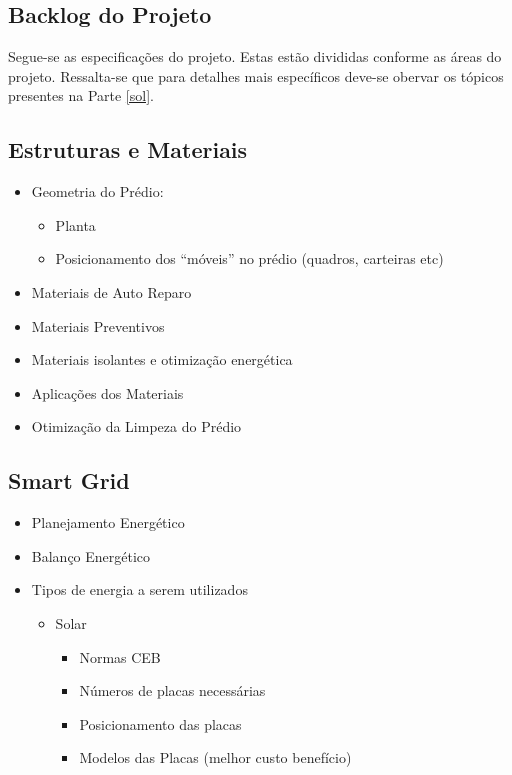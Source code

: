 \begin{apendicesenv}

\partapendices
\chapter{Backlog do Projeto}
\label{appendix:apdcA}

Segue-se as especificações do projeto. Estas estão divididas conforme as áreas do projeto. Ressalta-se que
 para detalhes mais específicos deve-se obervar os tópicos presentes na Parte \ref{sol}.

\section{Estruturas e Materiais}
  \begin{itemize}
    \item Geometria do Prédio:
    \begin{itemize}
      \item Planta
      \item Posicionamento dos “móveis” no prédio (quadros, carteiras etc)
    \end{itemize}
    \item Materiais de Auto Reparo
    \item Materiais Preventivos
    \item Materiais isolantes e otimização energética
    \item Aplicações dos Materiais
    \item Otimização da Limpeza do Prédio
  \end{itemize}
\section{Smart Grid}

  \begin{itemize}
    \item Planejamento Energético
    \item Balanço Energético
    \item Tipos de energia a serem utilizados
    \begin{itemize}
      \item Solar
        \begin{itemize}
          \item Normas CEB
          \item Números de placas necessárias
          \item Posicionamento das placas
          \item Modelos das Placas (melhor custo benefício)
        \end{itemize}


\end{itemize}
\end{itemize}
\end{apendicesenv}
